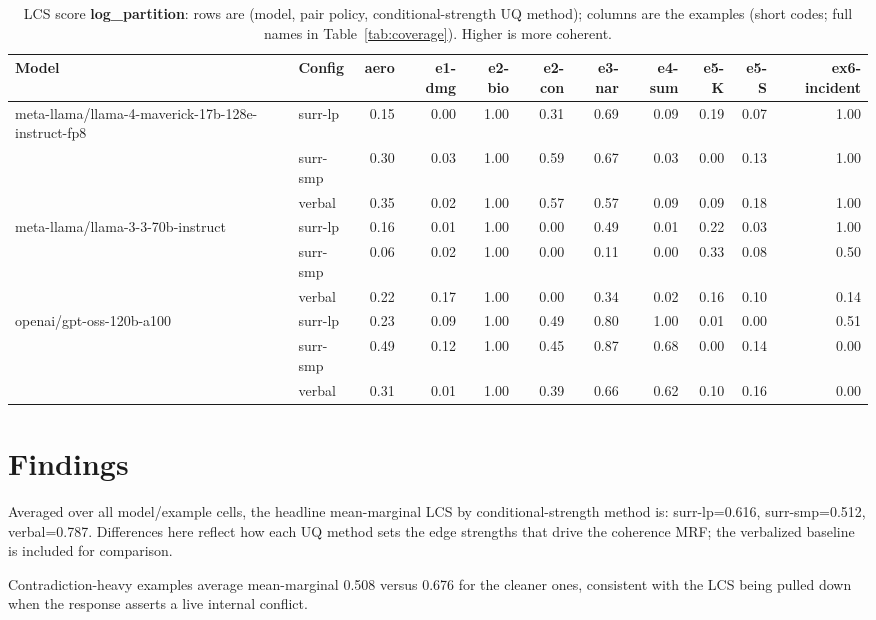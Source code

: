 \documentclass[11pt]{article}
\begin{document}
\begin{table}[htbp]
\centering
\footnotesize
\setlength{\tabcolsep}{3.5pt}
\caption{LCS score \textbf{log\_partition}: rows are (model, pair policy, conditional-strength UQ method); columns are the examples (short codes; full names in Table~\ref{tab:coverage}). Higher is more coherent.}
\label{tab:log-partition}
\begin{tabular}{llrrrrrrrrr}
\toprule
\textbf{Model} & \textbf{Config} & \textbf{aero} & \textbf{e1-dmg} & \textbf{e2-bio} & \textbf{e2-con} & \textbf{e3-nar} & \textbf{e4-sum} & \textbf{e5-K} & \textbf{e5-S} & \textbf{ex6-incident} \\
\midrule
meta-llama/llama-4-maverick-17b-128e-instruct-fp8 & surr-lp & 0.15 & 0.00 & 1.00 & 0.31 & 0.69 & 0.09 & 0.19 & 0.07 & 1.00 \\
 & surr-smp & 0.30 & 0.03 & 1.00 & 0.59 & 0.67 & 0.03 & 0.00 & 0.13 & 1.00 \\
 & verbal & 0.35 & 0.02 & 1.00 & 0.57 & 0.57 & 0.09 & 0.09 & 0.18 & 1.00 \\
\midrule
meta-llama/llama-3-3-70b-instruct & surr-lp & 0.16 & 0.01 & 1.00 & 0.00 & 0.49 & 0.01 & 0.22 & 0.03 & 1.00 \\
 & surr-smp & 0.06 & 0.02 & 1.00 & 0.00 & 0.11 & 0.00 & 0.33 & 0.08 & 0.50 \\
 & verbal & 0.22 & 0.17 & 1.00 & 0.00 & 0.34 & 0.02 & 0.16 & 0.10 & 0.14 \\
\midrule
openai/gpt-oss-120b-a100 & surr-lp & 0.23 & 0.09 & 1.00 & 0.49 & 0.80 & 1.00 & 0.01 & 0.00 & 0.51 \\
 & surr-smp & 0.49 & 0.12 & 1.00 & 0.45 & 0.87 & 0.68 & 0.00 & 0.14 & 0.00 \\
 & verbal & 0.31 & 0.01 & 1.00 & 0.39 & 0.66 & 0.62 & 0.10 & 0.16 & 0.00 \\
\bottomrule
\end{tabular}
\end{table}


\section{Findings}

Averaged over all model/example cells, the headline mean-marginal LCS by conditional-strength method is: surr-lp=0.616, surr-smp=0.512, verbal=0.787. Differences here reflect how each UQ method sets the edge strengths that drive the coherence MRF; the verbalized baseline is included for comparison.

Contradiction-heavy examples average mean-marginal 0.508 versus 0.676 for the cleaner ones, consistent with the LCS being pulled down when the response asserts a live internal conflict.
\end{document}
